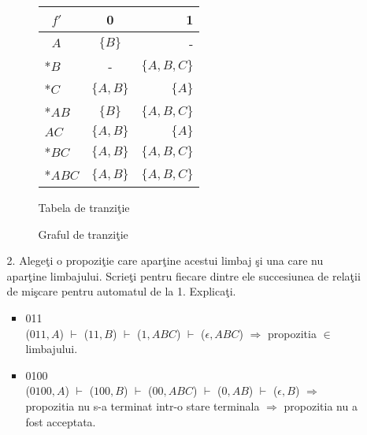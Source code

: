 \begin{enumerate}
\begin{itemize}
\begin{figure}[H]
\begin{tabular}{ l | c r }
      $\;\;f'$     &            	0 &         1\\
   	  \hline
  	  $\;\;A$    & $\{B\}$	    &           -\\
  	  *$B$       &           -		&$\{A, B,C\}$\\
 	  *$C$       & $\{A,B\}$ 	 & $\{A\}$\\
	  *$AB$ &$\{B\}$ & $\{A, B,C\}$\\
	  $AC$ &$\{A,B\}$ & $\{A\}$\\
	  *$BC$ &$\{A,B\}$ & $\{A, B,C\}$\\
	  *$ABC$ &$\{A,B\}$ & $\{A, B,C\}$\\  
\end{tabular}
\caption{Tabela de tranziţie}
\end{figure}

\begin{figure}[H]
\caption{Graful de tranziţie}
\end{figure}

\item[2.] Alegeţi o propoziţie care aparţine acestui limbaj şi una care nu aparţine limbajului. Scrieţi pentru fiecare dintre ele succesiunea de relaţii de mişcare pentru automatul de la 1. Explicaţi.
\begin{itemize}
\item 011
\\($011,A$) $\vdash$ ($11,B$) $\vdash$ ($1,ABC$) $\vdash$ ($\epsilon , ABC$) $\Rightarrow$ propozitia $\in$ limbajului.
\item 0100
\\($0100,A$) $\vdash$ ($100,B$) $\vdash$ ($00,ABC$) $\vdash$ ($0,AB$) $\vdash$ ($\epsilon, B$) $\Rightarrow$ propozitia nu s-a terminat intr-o stare terminala $\Rightarrow$ propozitia nu a fost acceptata. 
\end{itemize}
\end{itemize}


\end{enumerate}
